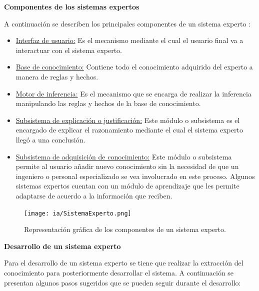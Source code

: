 \documentclass[11pt,fleqn]{book} %
\begin{document}
\textbf{Componentes de los sistemas expertos}

A continuación se describen los principales componentes de un sistema experto \cite{tms_ES}:
\begin{itemize}
\item \underline{Interfaz de usuario:} Es el mecanismo mediante el cual el usuario final va a interactuar con el sistema experto.
\item \underline{Base de conocimiento:} Contiene todo el conocimiento adquirido del experto a manera de reglas y hechos.
\item \underline{Motor de inferencia:} Es el mecanismo que se encarga de realizar la inferencia manipulando las reglas y hechos de la base de conocimiento.
\item \underline{Subsistema de explicación o justificación:} Este módulo o subsistema es el encargado de explicar el razonamiento mediante el cual el sistema experto llegó a una conclusión.
\item \underline{Subsistema de adquisición de conocimiento:} Este módulo o subsistema permite al usuario añadir nuevo conocimiento sin la necesidad de que un ingeniero o personal especializado se vea involucrado en este proceso.
Algunos sistemas expertos cuentan con un módulo de aprendizaje que les permite adaptarse de acuerdo a la información que reciben.
\end{itemize}

\begin{figure}[ht]
\centering\texttt{[image: ia/SistemaExperto.png]}
\caption{Representación gráfica de los componentes de un sistema experto.}

\label{fig:SistemaExperto} 
\end{figure}

\textbf{Desarrollo de un sistema experto}

Para el desarrollo de un sistema experto se tiene que realizar la extracción del conocimiento para posteriormente desarrollar el sistema. A continuación se presentan algunos pasos sugeridos que se pueden seguir durante el desarrollo:
\end{document}
